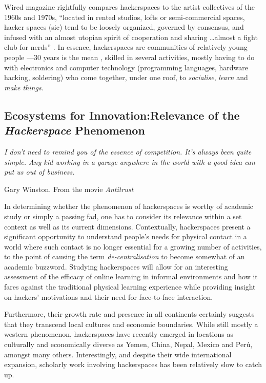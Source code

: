 Wired magazine rightfully compares hackerspaces to the artist collectives of the 1960s and 1970s, ``located in rented studios, lofts or semi-com\-mer\-cial spaces, hacker spaces (sic) tend to be loosely organized, governed by consensus, and infused with an almost utopian spirit of cooperation and sharing \ldots almost a fight club for nerds'' \citep{tweney09}. In essence, hackerspaces are communities of relatively young people ---30 years is the mean \citep{moilanen10}, skilled in several activities, mostly having to do with electronics and computer technology (programming languages, hardware hacking, soldering) who come together, under one roof, to \emph{socialise}, \emph{learn} and \emph{make things}.

\subsection{Ecosystems for Innovation:\newline{}Relevance of the \emph{Hackerspace} Phenomenon}

\epigraph{\textit{I don't need to remind you of the essence of competition. It's always been quite simple. Any kid working in a garage anywhere in the world with a good idea can put us out of business.}}{Gary Winston. From the movie \textit{Antitrust}}

In determining whether the phenomenon of hackerspaces is worthy of academic study or simply a passing fad, one has to consider its relevance within a set context as well as its current dimensions. Contextually, hackerspaces present a significant opportunity to understand people's needs for physical contact in a world where such contact is no longer essential for a growing number of activities, to the point of causing the term \textit{de-centralisation} to become somewhat of an academic buzzword. Studying hackerspaces will allow for an interesting assessment of the efficacy of online learning in informal environments and how it fares against the traditional physical learning experience while providing insight on hackers' motivations and their need for face-to-face interaction.

Furthermore, their growth rate and presence in all continents certainly suggests that they transcend local cultures and economic boundaries. While still mostly a western phenomenon, hackerspaces have recently emerged in locations as culturally and economically diverse as Yemen, China, Nepal, Mexico and Per\'{u}, amongst many others. Interestingly, and despite their wide international expansion, scholarly work involving hackerspaces has been relatively slow to catch up.

